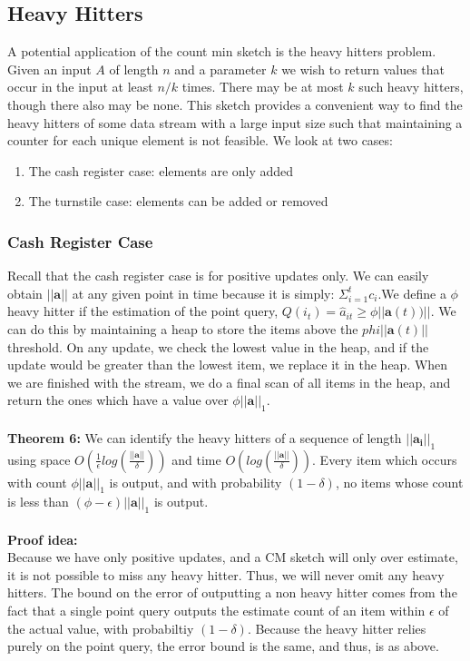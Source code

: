 \documentclass[11pt]{article}
\begin{document}
\subsection{Heavy Hitters}
A potential application of the count min sketch is the heavy hitters problem. Given an input $A$ of length $n$ and a parameter $k$ we wish to return values that occur in the input at least $n/k$ times. There may be at most $k$ such heavy hitters, though there also may be none. This sketch provides a convenient way to find the heavy hitters of some data stream with a large input size such that maintaining a counter for each unique element is not feasible. We look at two cases:
\begin{enumerate}
\item The cash register case: elements are only added
\item The turnstile case: elements can be added or removed
\end{enumerate}

\subsubsection{Cash Register Case}
Recall that the cash register case is for positive updates only. We can easily obtain $||\bm{a}||$ at any given point in time because it is simply: $\Sigma_{i=1}^t c_i$.We define a $\phi$ heavy hitter if the estimation of the point query, $Q(i_t) =  \hat a_{it} \geq \phi ||\bm{a}(t))||$. We can do this by maintaining a heap to store the items above the $phi||\bm{a}(t)||$ threshold. On any update, we check the lowest value in the heap, and if the update would be greater than the lowest item, we replace it in the heap. When we are finished with the stream, we do a final scan of all items in the heap, and return the ones which have a value over $\phi||\bm{a}||_1$.\\\\
\textbf{Theorem 6: } We can identify the heavy hitters of a sequence of length $||\bm{a_i}||_1$ using space $O(\frac{1}{\epsilon}log(\frac{||\bm{a}||}{\delta}))$ and time $O(log(\frac{||\bm{a}||}{\delta}))$. Every item which occurs with count $\phi ||\bm{a}||_1$ is output, and with probability $(1-\delta)$, no items whose count is less than $(\phi - \epsilon)||\bm{a}||_1$ is output.\\\\
\textbf{Proof idea:}\\
Because we have only positive updates, and a CM sketch will only over estimate, it is not possible to miss any heavy hitter. Thus, we will never omit any heavy hitters. The bound on the error of outputting a non heavy hitter comes from the fact that a single point query outputs the estimate count of an item within $\epsilon$ of the actual value, with probabiltiy $(1-\delta)$. Because the heavy hitter relies purely on the point query, the error bound is the same, and thus, is as above.\\\\
\end{document}
